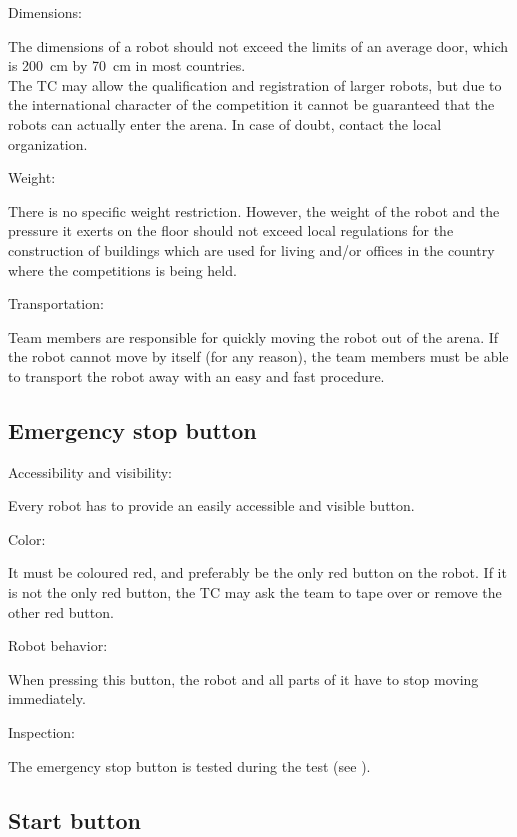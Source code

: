 \begin{enumerate}
{\bf\item Dimensions:} The dimensions of a robot should not exceed the limits of an average door, 
which is \SI{200}{\centi\meter} by \SI{70}{\centi\meter} in most countries.\\ 
The TC may allow the qualification and registration of larger robots, 
but due to the international character of the competition it cannot be guaranteed that the robots can actually enter the arena.  
In case of doubt, contact the local organization. 
{\bf\item Weight:} There is no specific weight restriction. 
However, the weight of the robot and the pressure it exerts on the floor should not exceed 
local regulations for the construction of buildings which are used for
living and/or offices in the country where the competitions is being held.
{\bf\item Transportation:} Team members are responsible for quickly moving the robot out of the arena. 
If the robot cannot move by itself (for any reason), the team members must 
be able to transport the robot away with an easy and fast procedure.
\end{enumerate}



\subsection{Emergency stop button}\label{rule:robots_emergency_button}

\begin{enumerate}
{\bf\item Accessibility and visibility:} Every robot has to provide an easily accessible and visible  button. 
{\bf\item Color:} It must be coloured red, and preferably be the only red button on the robot. 
If it is not the only red button, the TC may ask the team to tape over or remove the other red button. 
{\bf\item Robot behavior:} When pressing this button, the robot and all parts of it have to stop moving immediately.
{\bf\item Inspection:} The emergency stop button is tested during the  test (see ).
\end{enumerate}



\subsection{Start button}
\label{rule:start_button}

